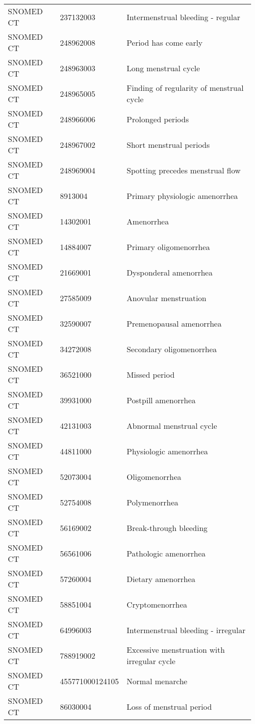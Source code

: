 \begin{longtable}{p{}p{}p{}}
  SNOMED CT & 237132003 & Intermenstrual bleeding - regular \\ 
  SNOMED CT & 248962008 & Period has come early \\ 
  SNOMED CT & 248963003 & Long menstrual cycle \\ 
  SNOMED CT & 248965005 & Finding of regularity of menstrual cycle \\ 
  SNOMED CT & 248966006 & Prolonged periods \\ 
  SNOMED CT & 248967002 & Short menstrual periods \\ 
  SNOMED CT & 248969004 & Spotting precedes menstrual flow \\ 
  SNOMED CT & 8913004 & Primary physiologic amenorrhea \\ 
  SNOMED CT & 14302001 & Amenorrhea \\ 
  SNOMED CT & 14884007 & Primary oligomenorrhea \\ 
  SNOMED CT & 21669001 & Dysponderal amenorrhea \\ 
  SNOMED CT & 27585009 & Anovular menstruation \\ 
  SNOMED CT & 32590007 & Premenopausal amenorrhea \\ 
  SNOMED CT & 34272008 & Secondary oligomenorrhea \\ 
  SNOMED CT & 36521000 & Missed period \\ 
  SNOMED CT & 39931000 & Postpill amenorrhea \\ 
  SNOMED CT & 42131003 & Abnormal menstrual cycle \\ 
  SNOMED CT & 44811000 & Physiologic amenorrhea \\ 
  SNOMED CT & 52073004 & Oligomenorrhea \\ 
  SNOMED CT & 52754008 & Polymenorrhea \\ 
  SNOMED CT & 56169002 & Break-through bleeding \\ 
  SNOMED CT & 56561006 & Pathologic amenorrhea \\ 
  SNOMED CT & 57260004 & Dietary amenorrhea \\ 
  SNOMED CT & 58851004 & Cryptomenorrhea \\ 
  SNOMED CT & 64996003 & Intermenstrual bleeding - irregular \\ 
  SNOMED CT & 788919002 & Excessive menstruation with irregular cycle \\ 
  SNOMED CT & 455771000124105 & Normal menarche \\ 
  SNOMED CT & 86030004 & Loss of menstrual period \\ 

\end{longtable}
